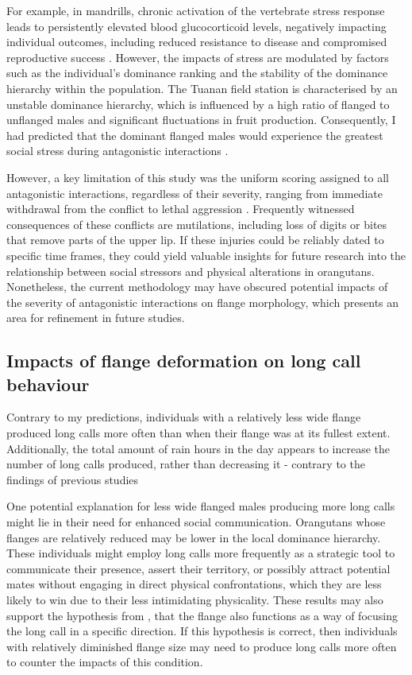 For example, in mandrills, chronic activation of the vertebrate stress response leads to persistently elevated blood glucocorticoid levels, negatively impacting individual outcomes, including reduced resistance to disease and compromised reproductive success \citep{Setchell.2010}. However, the impacts of stress are modulated by factors such as the individual's dominance ranking and the stability of the dominance hierarchy within the population. The Tuanan field station is characterised by an unstable dominance hierarchy, which is influenced by a high ratio of flanged to unflanged males and significant fluctuations in fruit production. Consequently, I had predicted that the dominant flanged males would experience the greatest social stress during antagonistic interactions \citep{Sapolsky.2005gvn}.

However, a key limitation of this study was the uniform scoring assigned to all antagonistic interactions, regardless of their severity, ranging from immediate withdrawal from the conflict to lethal aggression \citep{Knott.2008, Setia.2008}. Frequently witnessed consequences of these conflicts are mutilations, including loss of digits or bites that remove parts of the upper lip. If these injuries could be reliably dated to specific time frames, they could yield valuable insights for future research into the relationship between social stressors and physical alterations in orangutans. Nonetheless, the current methodology may have obscured potential impacts of the severity of antagonistic interactions on flange morphology, which presents an area for refinement in future studies.

\subsection{Impacts of flange deformation on long call behaviour}

Contrary to my predictions, individuals with a relatively less wide flange produced long calls more often than when their flange was at its fullest extent. Additionally, the total amount of rain hours in the day appears to increase the number of long calls produced, rather than decreasing it - contrary to the findings of previous studies \citep{Spillmann.2016}

One potential explanation for less wide flanged males producing more long calls might lie in their need for enhanced social communication. Orangutans whose flanges are relatively reduced may be lower in the local dominance hierarchy. These individuals might employ long calls more frequently as a strategic tool to communicate their presence, assert their territory, or possibly attract potential mates without engaging in direct physical confrontations, which they are less likely to win due to their less intimidating physicality. These results may also support the hypothesis from \citet{Mitani.1985}, that the flange also functions as a way of focusing the long call in a specific direction. If this hypothesis is correct, then individuals with relatively diminished flange size may need to produce long calls more often to counter the impacts of this condition.

